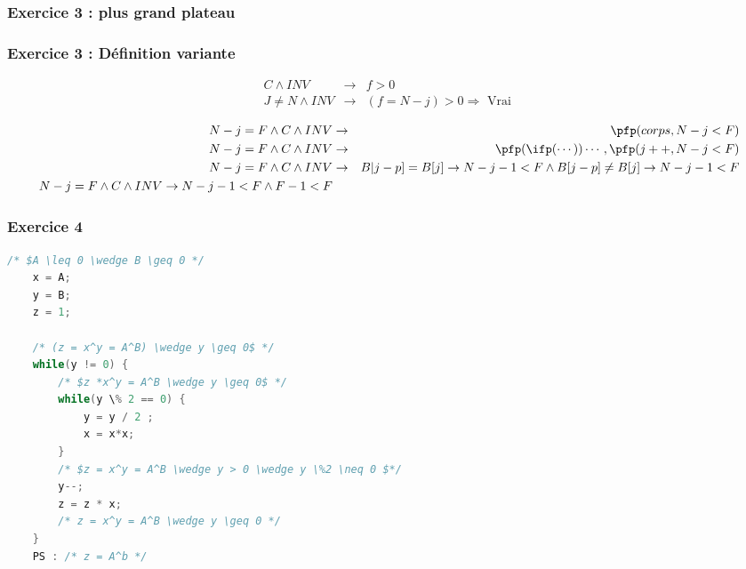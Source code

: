 \subsubsection{Exercice 3 : plus grand plateau}

\subsubsection{Exercice 3 : Définition variante}
\begin{eqnarray*}
	C \wedge INV &\rightarrow& f > 0\\
	J \neq N \wedge INV &\rightarrow& (f = N-j) >0 \Rightarrow \textrm{ Vrai }
\end{eqnarray*}

\begin{eqnarray*}
	N-j  =F \wedge C \wedge INV &\rightarrow& \pfp(corps, N-j < F)\\
	N-j  =F \wedge C \wedge INV &\rightarrow& \pfp(\ifp(\cdots))\cdots,\pfp(j++,N-j<F)\\
	N-j  =F \wedge C \wedge INV &\rightarrow& B|j-p] = B[j] \rightarrow N - j -1 < F \wedge B[j-p] \neq B[j] \rightarrow N-j-1 < F\\
	N-j = F \wedge C \wedge INV \rightarrow N-j-1 < F \wedge F-1 < F
\end{eqnarray*}

\subsubsection{Exercice 4}
\begin{lstlisting}[language=C]
	/* $A \leq 0 \wedge B \geq 0 */
	x = A;
	y = B;
	z = 1;

	/* (z = x^y = A^B) \wedge y \geq 0$ */
	while(y != 0) {
		/* $z *x^y = A^B \wedge y \geq 0$ */
		while(y \% 2 == 0) {
			y = y / 2 ;
			x = x*x;
		}
		/* $z = x^y = A^B \wedge y > 0 \wedge y \%2 \neq 0 $*/
		y--;
		z = z * x;
		/* z = x^y = A^B \wedge y \geq 0 */
	}
	PS : /* z = A^b */

\end{lstlisting}
